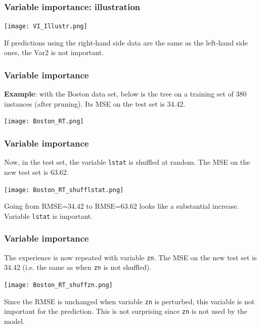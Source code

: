 \begin{frame}
\frametitle{Variable importance: illustration}
\begin{center}
\texttt{[image: VI\_Illustr.png]}
\end{center}
If predictions using the right-hand side data are the same as the left-hand side ones, the Var2 is not important.
\end{frame}
\begin{frame}
\frametitle{Variable importance}
{\bf Example}: with the Boston data set, below is the tree on a training set of 380 instances (after pruning). Its MSE on the test set is 34.42.
\begin{center}
\texttt{[image: Boston\_RT.png]}
\end{center}
\end{frame}
\begin{frame}
\frametitle{Variable importance}
Now, in the test set, the variable {\tt lstat} is shuffled at random. The MSE on the new test set is 63.62. 
\begin{center}
\texttt{[image: Boston\_RT\_shufflstat.png]}
\end{center}
Going from RMSE=34.42 to RMSE=63.62 looks like a substantial increase. Variable {\tt lstat} is important.
\end{frame}
\begin{frame}
\frametitle{Variable importance}
The experience is now repeated with variable {\tt zn}. The MSE on the new test set is 34.42 (i.e. the same as when {\tt zn} is not shuffled). 
\begin{center}
\texttt{[image: Boston\_RT\_shuffzn.png]}
\end{center}
Since the RMSE is unchanged when variable {\tt zn} is perturbed, this variable is not important for the prediction. This is not surprising since {\tt zn} is not used by the model. 
\end{frame}
